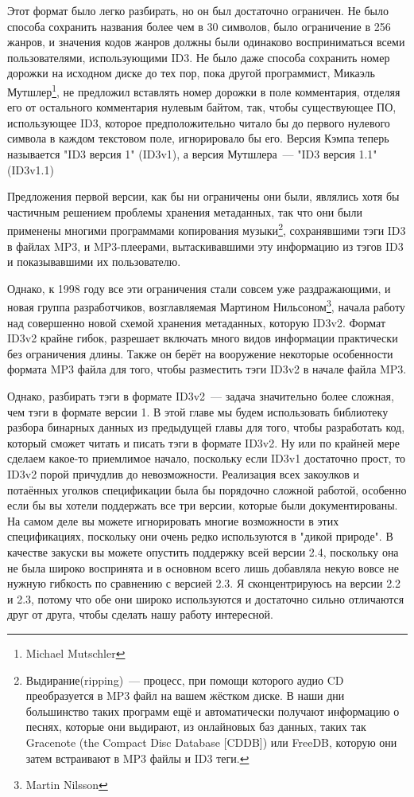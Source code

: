 Этот формат было легко разбирать, но он был достаточно ограничен. Не было способа
сохранить названия более чем в 30 символов, было ограничение в 256 жанров, и значения
кодов жанров должны были одинаково восприниматься всеми пользователями, использующими
ID3. Не было даже способа сохранить номер дорожки на исходном диске до тех пор, пока
другой программист, Микаэль Мутшлер\footnote{Michael Mutschler}, не предложил вставлять
номер дорожки в поле комментария, отделяя его от остального комментария нулевым байтом,
так, чтобы существующее ПО, использующее ID3, которое предположительно читало бы до
первого нулевого символа в каждом текстовом поле, игнорировало бы его. Версия Кэмпа теперь
называется "ID3 версия 1" (ID3v1), а версия Мутшлера~--- "ID3 версия 1.1" (ID3v1.1)

Предложения первой версии, как бы ни ограничены они были, являлись хотя бы частичным
решением проблемы хранения метаданных, так что они были применены многими программами
копирования музыки\footnote{Выдирание(ripping)~--- процесс, при помощи которого аудио CD
  преобразуется в MP3 файл на вашем жёстком диске. В наши дни большинство таких программ
  ещё и автоматически получают информацию о песнях, которые они выдирают, из онлайновых
  баз данных, таких так Gracenote (the Compact Disc Database [CDDB]) или FreeDB, которую
  они затем встраивают в MP3 файлы и ID3 теги.}, сохранявшими тэги ID3 в файлах MP3, и
MP3-плеерами, вытаскивавшими эту информацию из тэгов ID3 и показывавшими их пользователю.

Однако, к 1998 году все эти ограничения стали совсем уже раздражающими, и новая группа
разработчиков, возглавляемая Мартином Нильсоном\footnote{Martin Nilsson}, начала работу
над совершенно новой схемой хранения метаданных, которую ID3v2. Формат ID3v2 крайне гибок,
разрешает включать много видов информации практически без ограничения длины. Также он
берёт на вооружение некоторые особенности формата MP3 файла для того, чтобы разместить
тэги ID3v2 в начале файла MP3.

Однако, разбирать тэги в формате ID3v2~--- задача значительно более сложная, чем тэги в
формате версии 1. В этой главе мы будем использовать библиотеку разбора бинарных данных из
предыдущей главы для того, чтобы разработать код, который сможет читать и писать тэги в
формате ID3v2. Ну или по крайней мере сделаем какое-то приемлимое начало, поскольку если
ID3v1 достаточно прост, то ID3v2 порой причудлив до невозможности. Реализация всех
закоулков и потаённых уголков спецификации была бы порядочно сложной работой, особенно
если бы вы хотели поддержать все три версии, которые были документированы. На самом деле
вы можете игнорировать многие возможности в этих спецификациях, поскольку они очень редко
используются в "дикой природе".  В качестве закуски вы можете опустить поддержку всей
версии 2.4, поскольку она не была широко воспринята и в основном всего лишь добавляла
некую вовсе не нужную гибкость по сравнению с версией 2.3. Я сконцентрируюсь на версии 2.2
и 2.3, потому что обе они широко используются и достаточно сильно отличаются друг от
друга, чтобы сделать нашу работу интересной.

